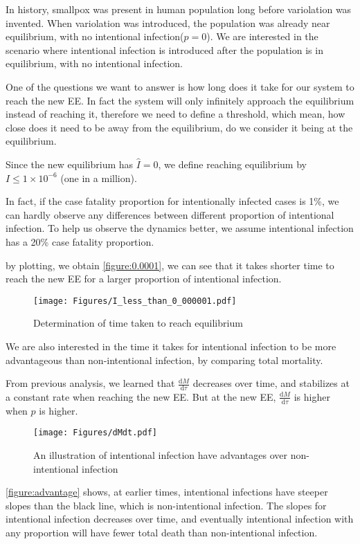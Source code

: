 \documentclass[12pt]{article}
\newcommand\dbyd[2]{\frac{\mathrm d{#1}}{\mathrm d{#2}}}
\begin{document}
In history, smallpox was present in human population long before variolation was invented. When variolation was introduced, the population was already near equilibrium, with no intentional infection($p=0$). We are interested in the scenario where intentional infection is introduced after the population is in equilibrium, with no intentional infection.

One of the questions we want to answer is how long does it take for our system to reach the new EE. In fact the system will only infinitely approach the equilibrium instead of reaching it, therefore we need to define a threshold, which mean, how close does it need to be away from the equilibrium, do we consider it being at the equilibrium.

Since the new equilibrium has $\hat{I}=0$, we define reaching equilibrium by $I\leq 1\times 10^{-6}$ (one in a million).

In fact, if the case fatality proportion for intentionally infected cases is 1\%, we can hardly observe any differences between different proportion of intentional infection. To help us observe the dynamics better, we assume intentional infection has a 20\% case fatality proportion.

by plotting, we obtain \autoref{figure:0.0001}, we can see that it takes shorter time to reach the new EE for a larger proportion of intentional infection.
\begin{figure}[h]
  \centering
  \texttt{[image: Figures/I\_less\_than\_0\_000001.pdf]}
  \caption{Determination of time taken to reach equilibrium}
\label{figure:0.0001}
\end{figure}

We are also interested in the time it takes for intentional infection to be more advantageous than non-intentional infection, by comparing total mortality.

From previous analysis, we learned that $\dbyd{M}{\tau}$ decreases over time, and stabilizes at a constant rate when reaching the new EE. But at the new EE, $\dbyd{M}{\tau}$ is higher when $p$ is higher. 

\begin{figure}[H]
  \centering
  \texttt{[image: Figures/dMdt.pdf]}
  \caption{An illustration of intentional infection have advantages over non-intentional infection}
\label{figure:advantage}
\end{figure}

\autoref{figure:advantage} shows, at earlier times, intentional infections have steeper slopes than the black line, which is non-intentional infection. The slopes for intentional infection decreases over time, and eventually intentional infection with any proportion will have fewer total death than non-intentional infection.
\end{document}

